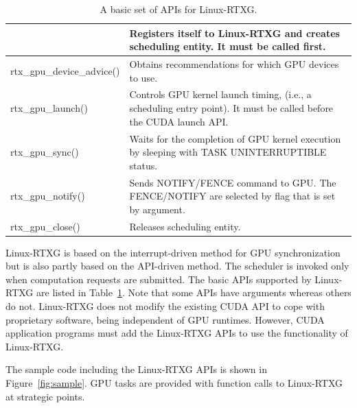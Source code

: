 \begin{table}[!t]
\begin{center}
\caption{A basic set of APIs for Linux-RTXG.}
\label{tab:rtx-api}
\ifthesis
\begin{tabular}{|l|p{25em}|} \hline
\else
\begin{tabular}{|l|p{50em}|} \hline
\fi
rtx\_gpu\_open() & Registers itself to Linux-RTXG and creates scheduling entity. It must be called first. \\ \hline
rtx\_gpu\_device\_advice() & Obtains recommendations for which GPU devices to use. \\ \hline
rtx\_gpu\_launch() & Controls GPU kernel launch timing, (i.e., a scheduling entry point). It must be called before the CUDA launch API. \\ \hline
rtx\_gpu\_sync() & Waits for the completion of GPU kernel execution by sleeping with TASK UNINTERRUPTIBLE status. \\ \hline
rtx\_gpu\_notify() & Sends NOTIFY/FENCE command to GPU. The FENCE/NOTIFY are selected by flag that is set by argument.\\ \hline
rtx\_gpu\_close() & Releases scheduling entity.\\ \hline
\end{tabular}
\end{center}
\end{table}

Linux-RTXG is based on the interrupt-driven method for GPU
synchronization but is also partly based on the API-driven method.
The scheduler is invoked only when computation requests are submitted.
The basic APIs supported by Linux-RTXG are listed in Table~\ref{tab:rtx-api}.
Note that some APIs have arguments whereas others do not.
Linux-RTXG does not modify the existing CUDA API to cope with
proprietary software, being independent of GPU runtimes. 
However, CUDA application programs must add the Linux-RTXG APIs to use
the functionality of Linux-RTXG.

The sample code including the Linux-RTXG APIs is shown in
Figure~\ref{fig:sample}.
GPU tasks are provided with function calls to Linux-RTXG at strategic
points.

